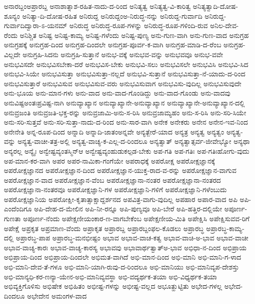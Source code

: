 {ಅನಾರಬ್ದಂಅಪ್ರಾರಬ್ದ
ಅನಾಶಾತ್ನಾಶ-ರಹಿತ-ನಾದು-ದ-ರಿಂದ
ಅನಿತ್ಯತ್ವ
ಅನಿತ್ಯತ್ವ-ವಿ-ಕಾರಿತ್ವ
ಅನಿತ್ಯತ್ವಾದಿ-ದೋಷ-ಶೂನ್ಯಂ
ಅನಿತ್ಯಾ-ದಿ-ದೋಷ-ರಹಿತ
ಅನಿರುದ್ದ
ಅನಿರುದ್ದಂಅ-ನಿರುದ್ಧ-ನನ್ನು
ಅನಿರುದ್ದ-ಗುರ್ವಾದಿ
ಅನಿರುದ್ದ-ಗುರ್ವಾದಿದ್ವಾರಾ-ಽ-ಯನಮ್
ಅನಿರುದ್ಧ
ಅನಿರುದ್ಧ-ರೂಪ-ಗಳನ್ನು
ಅನಿರುದ್ಧ-ರೂಪ-ಗಳಿಂದಿ-ರುವ
ಅನಿಲ-ದೇವ-ರೆಂದು
ಅನಿಶ್ಚಿತ
ಅನಿಷ್ಟ
ಅನಿಷ್ಟ-ಕಾಮ್ಯ
ಅನಿಷ್ಟ-ಗಳೆಂದು
ಅನಿಷ್ಟ-ಪುಣ್ಯ
ಅನು-ಗುಣ-ವಾಗಿ
ಅನು-ಗುಣ-ವಾದ
ಅನುಗ್ರಹ
ಅನುಗ್ರಹಕ್ಕೆ
ಅನುಗ್ರಹ-ದಿಂದ
ಅನುಗ್ರಹ-ದಿಂದಲೇ
ಅನುಗ್ರಹ-ಪೂರ್ವ-ಕ-ವಾಗಿ
ಅನುಗ್ರಹ-ಮಾಡಿ-ದ-ರೆಂಬ
ಅನುಗ್ರಹ-ವಿಲ್ಲದೇ
ಅನುಗ್ರಹಿ-ಸಿದನು
ಅನುಗ್ರಹಿ-ಸುತ್ತಾನೆ
ಅನುಭ-ವಕ್ಕೆ
ಅನುಭವ-ವನ್ನು
ಅನುಭವವೂ
ಅನುಭ-ವವೇ
ಅನುಭವಿಸದೇ
ಅನುಭವಿಸಬೇಕಾ-ದರೆ
ಅನುಭವಿಸ-ಬೇಕು
ಅನುಭವಿ-ಸಲು
ಅನುಭವಿಸಲೇ
ಅನುಭವಿಸಿ
ಅನುಭವಿ-ಸಿದ
ಅನುಭವಿ-ಸಿಯೇ
ಅನುಭವಿಸುತ್ತಾ
ಅನುಭವಿಸುತ್ತಾ-ನಲ್ಲದೆ
ಅನುಭವಿ-ಸುತ್ತಾನೆ
ಅನುಭವಿಸುತ್ತಾ-ನೆ-ಯಾದು-ದ-ರಿಂದ
ಅನುಭವಿಸುತ್ತಾರೆ
ಅನುಭವಿಸುವ
ಅನುಭವಿಸುವ-ವರು
ಅನುಭವಿಸುವಾಗ
ಅನುಭವಿಸು-ವುದಿಲ್ಲ
ಅನುಭವಿಸುವುದೇ
ಅನು-ಭೂಯ
ಅನು-ಮಾನ-ಗಳು
ಅನು-ವಾದ
ಅನು-ವಾದ-ಗೊಂಡಿದ್ದು
ಅನು-ವಾದ-ಗೊಂಡು
ಅನು-ವಾದವು
ಅನುವಿಷ್ಟಅಂತಃಪ್ರವಿಷ್ಟ-ನಾಗಿ
ಅನುವ್ಯಾಖ್ಯಾನ
ಅನುವ್ಯಾಖ್ಯಾನೇ-ಅನುವ್ಯಾಖ್ಯಾನ
ಅನುವ್ಯಾಖ್ಯಾನೇ-ಅನುವ್ಯಾಖ್ಯಾನ-ದಲ್ಲಿ
ಅನುವ್ರಜಂತಿ
ಅನುವ್ರಜತಿ-ಭಕ್ತ-ರನ್ನು
ಅನುವ್ರಜಾಮಿ-ಅನು-ಸ-ರಿಸಿ
ಅನುವ್ರಜಾಮ್ಯಹಂ
ಅನು-ಸ-ರಿಸಿ
ಅನು-ಸರಿ-ಸಿಯೇ
ಅನು-ಸರಿ-ಸುತ್ತವೆ
ಅನು-ಸರಿ-ಸುತ್ತಾ-ನಾದು-ದ-ರಿಂದ
ಅನು-ಸಾರ-ವಾಗಿ
ಅನೇಕ
ಅನೇಕರು
ಅನೇನ
ಅನೇನ-ಇವ-ನಿಂದ
ಅನೇನೇತಿ
ಅನ್ನ-ರೂಪ-ದಿಂದ
ಅನ್ನಾದಿ
ಅನ್ನಾದಿ-ಜಾತಂಅನ್ನವೇ
ಅನ್ಯತ್ಬೇರೆ-ಯಾದ
ಅನ್ಯತ್ರ
ಅನ್ಯತ್ವ
ಅನ್ಯತ್ವಂ
ಅನ್ಯತ್ವ-ವನ್ನು
ಅನ್ಯತ್ವ-ವಾಚೀ-ತತ್ರ-ಅಲ್ಲಿ
ಅನ್ಯತ್ವ-ವಾಚ್ಯ-ಕ-ಎಲ್ಲ-ದ-ರಿಂದಲೂ
ಅನ್ಯತ್ವಾತ್
ಅನ್ಯತ್ವಾತ್ಸರ್ವ-ಜೀವೇಭ್ಯೋ
ಅನ್ಯಥಾ
ಅನ್ಯರಲ್ಲ
ಅನ್ಯೈಃ
ಅನ್ವೇಷ್ಟವ್ಯಂತಸ್ಮಿನ್ಆ
ಅನ್ವೇಷ್ಟವ್ಯಂಹುಡುಕಲ್ಪಡ-ಬೇಕು
ಅಪ-ಗತಿ
ಅಪ-ಗತಿಃ
ಅಪ-ಗತಿಃಹೋಗು-ವುದು
ಅಪ-ಮಾನ-ಕರ-ವಾಗಿ
ಅಪರ
ಅಪರ-ನಾಮಿಕಾ-ಗಂಗೆಯೇ
ಅಪರಾಧಕ್ಕೆ
ಅಪರೋಕ್ಷ
ಅಪರೋಕ್ಷಜ್ಞಾನಕ್ಕೆ
ಅಪರೋಕ್ಷಜ್ಞಾನದ
ಅಪರೋಕ್ಷಜ್ಞಾನ-ದಿಂದ
ಅಪರೋಕ್ಷಜ್ಞಾನ-ಯುಕ್ತ-ರಾದ-ವ-ರನ್ನು
ಅಪರೋಕ್ಷಜ್ಞಾನ-ವಾಗುವ
ಅಪರೋಕ್ಷಜ್ಞಾನ-ವಾದ
ಅಪರೋಕ್ಷಜ್ಞಾನ-ವೆಂಬ
ಅಪರೋಕ್ಷಜ್ಞಾನಾ-ನಂತರ
ಅಪರೋಕ್ಷಜ್ಞಾನಾ-ನಂತರದ
ಅಪರೋಕ್ಷಜ್ಞಾನಾ-ನಂತರವೂ
ಅಪರೋಕ್ಷಜ್ಞಾನಿ-ಗಳ
ಅಪರೋಕ್ಷಜ್ಞಾನಿ-ಗಳಿಗೆ
ಅಪರೋಕ್ಷಜ್ಞಾನಿ-ಗಳೆಂಬುದು
ಅಪರೋಕ್ಷಜ್ಞಾನಿಯ
ಅಪರೋಕ್ಷೀ-ಕೃತಾತ್ಸಾಕ್ಷಾದ್ದರ್ಶನದ
ಅಪವಿತ್ರ-ವಾಗು-ವುದಿಲ್ಲ
ಅಪಹಾರ
ಅಪಾರ-ವಾದ
ಅಪಿ
ಅಪಿ-ಎಂದೆಂದಿಗೂ
ಅಪಿ-ದೇಹ-ದ-ಮೇಲಿನ
ಅಪಿ-ನೀ-ರನ್ನೂ
ಅಪಿ-ಪುಣ್ಯವೂ
ಅಪಿ-ಬೇರೆ
ಅಪಿ-ಹತ್ತಿರ-ದಲ್ಲಿಯೇ
ಅಪೂರ್ಣ-ಗುಣತಾ
ಅಪೂರ್ಣ-ನೆಂದು
ಅಪೇಕ್ಷಣೀಯಂಕಾರ-ಣ-ವಾಗಬೇಕೆಂಬ
ಅಪೇಕ್ಷಣೀಯ-ಮಿತಿ
ಅಪೇಕ್ಷಿಸಿ
ಅಪೇಕ್ಷಿಸುವವ-ರಿಗೆ
ಅಪೇಕ್ಷೆ
ಅಪ್ರಕೃತ
ಅಪ್ರಮಾಣ-ವೆಂದು
ಅಪ್ರಾಕೃತ
ಅಪ್ರಾರಬ್ದ
ಅಪ್ರಾರಬ್ದಂಫಲ-ಕೊಡಲು
ಅಪ್ರಾರಬ್ಧ
ಅಪ್ರಾರಬ್ಧ-ಕಾಮ್ಯ-ದಲ್ಲಿ
ಅಪ್ರಾರಬ್ಧ-ಪಾಪ
ಅಪ್ರಾರಬ್ಧ-ಮನಭೀಷ್ಟಂ
ಅಭಾವ
ಅಭಾವ-ವಾಚ-ಕತ್ವ
ಅಭಾವ-ವಾಚಿ-ಅ-ಭಾವ
ಅಭಾವ-ವಾಚೀ
ಅಭಾವ-ವಾಚ್ಯ-ಕಾರಃ
ಅಭಾವ-ವಾಚ್ಯ-ಕಾರಸ್ಯ
ಅಭಾವವು
ಅಭಾವಾರ್ಥತ್ವಾತ್ಅ-ಭಾವ
ಅಭಿಧಾ-ನ-ದಿಂದ
ಅಭಿಪ್ರಾಯ
ಅಭಿಪ್ರಾಯ-ದಿಂದ
ಅಭಿಪ್ರಾಯ-ದಿಂದಲೇ
ಅಭಿಮತ-ವಾಗಿದೆ
ಅಭಿ-ಮಾನ-ದಿಂದ
ಅಭಿ-ಮಾನಿ
ಅಭಿ-ಮಾನಿ-ಗ-ಳಾದ
ಅಭಿ-ಮಾನಿ-ದೇವ-ತೆ-ಗಳೂ
ಅಭಿ-ಮಾನಿ-ಯಾಗಿ-ರುವು-ದ-ರಿಂದಲೂ
ಅಭಿ-ಮಾನಿಯು
ಅಭಿ-ಮಾನಿವ್ಯಪ-ದೇಶಸ್ತು
ಅಭಿ-ಮಾನ್ಯಧಿ-ಕರ-ಣನ್ಯಾ-ಯೇನ-ಅಭಿ-ಮಾನಿವ್ಯವಸ್ಥಾ
ಅಭಿ-ವದ್ಯರ್ಥಕ-ತಯಾ
ಅಭಿ-ವಿಧ್ಯರ್ಥಕ-ತಯಾ
ಅಭಿವ್ಯಕ್ತಿಗೊಳಿಸು
ಅಭಿಷೇಕ
ಅಭಿಹಿತಂ
ಅಭೀಷ್ಟ-ಗಳನ್ನು
ಅಭೀಷ್ಟ-ವಲ್ಲದ
ಅಭೂತ್ಹುಟ್ಟಿತು
ಅಭೇದ-ಗಳಲ್ಲ
ಅಭೇದ-ದಿಂದಲೂ
ಅಭೇದೇನ
ಅಮಂಗಳ-ವಾದ
}
